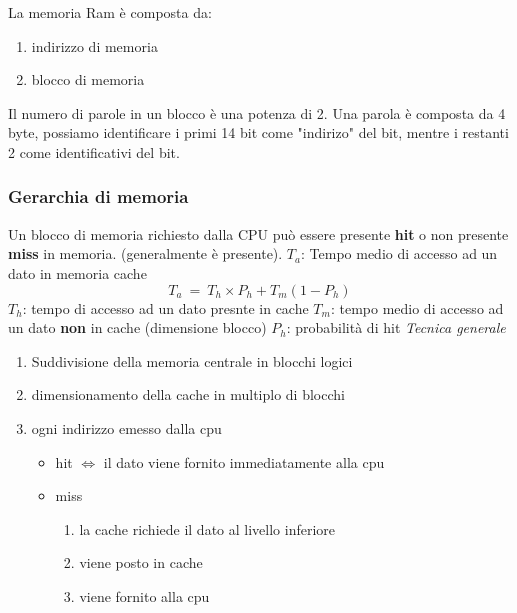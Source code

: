 \documentclass[12pt, a4paper]{article}
\begin{document}
La memoria Ram è composta da:
\begin{enumerate}
	\item indirizzo di memoria
	\item blocco di memoria 
\end{enumerate}
Il numero di parole in un blocco è una potenza di 2. \newline
Una parola è composta da 4 byte, possiamo identificare i primi 14 bit come "indirizo" del bit, mentre i restanti 2 come identificativi del bit.

\subsubsection{Gerarchia di memoria}
Un blocco di memoria richiesto dalla CPU può essere presente \textbf{hit} o non presente \textbf{miss} in memoria. (generalmente è presente). \newline
$T_a$: Tempo medio di accesso ad un dato in memoria cache 
\begin{equation} T_a\ =\ T_h \times P_h + T_m(1-P_h) \end{equation}
$T_h$: tempo di accesso ad un dato presnte in cache
$T_m$: tempo medio di accesso ad un dato \textbf{non} in cache (dimensione blocco)
$P_h$: probabilità di hit \newline
\textit{Tecnica generale} \newline
\begin{enumerate}
	\item Suddivisione della memoria centrale in blocchi logici
	\item dimensionamento della cache in multiplo di blocchi
	\item ogni indirizzo emesso dalla cpu
		\begin{itemize}
			\item hit $\iff$ il dato viene fornito immediatamente alla cpu
			\item miss
				\begin{enumerate}
					\item la cache richiede il dato al livello inferiore 
					\item viene posto in cache 
					\item viene fornito alla cpu 
				\end{enumerate}
		\end{itemize}
\end{enumerate}
\end{document}
